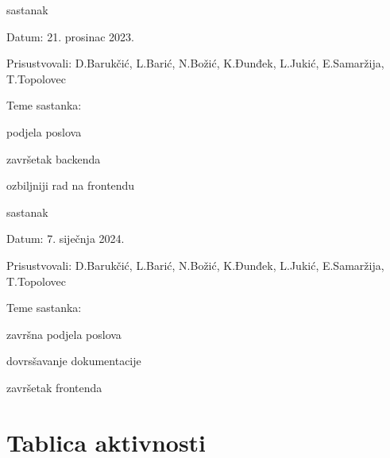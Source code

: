 \begin{packed_enum}
			\item  sastanak
			\item[] \begin{packed_item}
				\item Datum: 21. prosinac 2023.
				\item Prisustvovali: D.Barukčić, L.Barić, N.Božić, K.Đunđek, L.Jukić, E.Samaržija, T.Topolovec
				\item Teme sastanka:
				\begin{packed_item}
					\item  podjela poslova
					\item  završetak backenda
					\item  ozbiljniji rad na frontendu
				\end{packed_item}
			\end{packed_item}
			
			\item  sastanak
			\item[] \begin{packed_item}
				\item Datum: 7. siječnja 2024.
				\item Prisustvovali: D.Barukčić, L.Barić, N.Božić, K.Đunđek, L.Jukić, E.Samaržija, T.Topolovec
				\item Teme sastanka:
				\begin{packed_item}
					\item  završna podjela poslova
					\item  dovrsšavanje dokumentacije
					\item  završetak frontenda
				\end{packed_item}
			\end{packed_item}
			
			
		\end{packed_enum}
		
		\eject
		\section*{Tablica aktivnosti}
		
			

